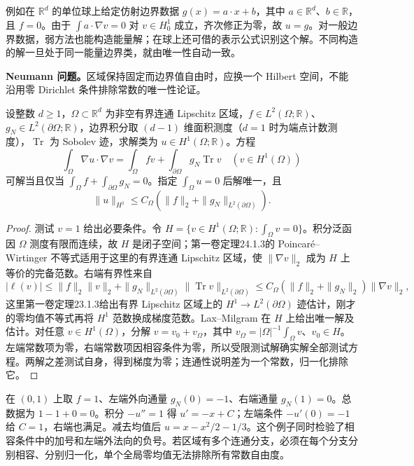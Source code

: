 \ProseParagraphBreak

例如在 \(\mathbb R^d\) 的单位球上给定仿射边界数据 \(g(x)=a\cdot x+b\)，其中 \(a\in\mathbb R^d\)、\(b\in\mathbb R\)，且 \(f=0\)。由于 \(\int a\cdot\nabla v=0\) 对 \(v\in H_0^1\) 成立，齐次修正为零，故 \(u=g\)。对一般边界数据，弱方法也能构造能量解；在球上还可借的表示公式识别这个解。不同构造的解一旦处于同一能量边界类，就由唯一性自动一致。


\ProseParagraphBreak

\noindent\textbf{Neumann 问题。}区域保持固定而边界值自由时，应换一个 Hilbert 空间，不能沿用零 Dirichlet 条件排除常数的唯一性论证。

\begin{proposition}
\label{b2:prop:15-neumann-normalized}
设整数 \(d\geq1\)，\(\Omega\subset\mathbb R^d\) 为非空有界连通 Lipschitz 区域，\(f\in L^2(\Omega;\mathbb R)\)、\(g_N\in L^2(\partial\Omega;\mathbb R)\)，边界积分取 \((d-1)\) 维面积测度（\(d=1\) 时为端点计数测度），\(\operatorname{Tr}\) 为 Sobolev 迹，求解类为 \(u\in H^1(\Omega;\mathbb R)\)。方程
\[\int_\Omega\nabla u\cdot\nabla v
 =\int_\Omega fv+\int_{\partial\Omega}g_N\operatorname{Tr}v
 \quad(v\in H^1(\Omega))\]
可解当且仅当 \(\int_\Omega f+\int_{\partial\Omega}g_N=0\)。指定 \(\int_\Omega u=0\) 后解唯一，且
\[\|u\|_{H^1}\le C_\Omega(\|f\|_2+\|g_N\|_{L^2(\partial\Omega)}).\]
\end{proposition}
\begin{proof}
测试 \(v=1\) 给出必要条件。令 \(H=\{v\in H^1(\Omega;\mathbb R):\int_\Omega v=0\}\)。积分泛函因 \(\Omega\) 测度有限而连续，故 \(H\) 是闭子空间；第一卷定理24.1.3的 Poincaré--Wirtinger 不等式适用于这里的有界连通 Lipschitz 区域，使 \(\|\nabla v\|_2\) 成为 \(H\) 上等价的完备范数。右端有界性来自
\[
 |\ell(v)|\le\|f\|_2\|v\|_2+
 \|g_N\|_{L^2(\partial\Omega)}\|\operatorname{Tr}v\|_{L^2(\partial\Omega)}
 \le C_\Omega(\|f\|_2+\|g_N\|_2)\|\nabla v\|_2,
\]
这里第一卷定理23.1.3给出有界 Lipschitz 区域上的 \(H^1\to L^2(\partial\Omega)\) 迹估计，刚才的零均值不等式再将 \(H^1\) 范数换成梯度范数。Lax--Milgram 在 \(H\) 上给出唯一解及估计。对任意 \(v\in H^1(\Omega)\)，分解 \(v=v_0+v_\Omega\)，其中 \(v_\Omega=|\Omega|^{-1}\int_\Omega v\)、\(v_0\in H\)。左端常数项为零，右端常数项因相容条件为零，所以受限测试解确实解全部测试方程。两解之差测试自身，得到梯度为零；连通性说明差为一个常数，归一化排除它。
\end{proof}

在 \((0,1)\) 上取 \(f=1\)、左端外向通量 \(g_N(0)=-1\)、右端通量 \(g_N(1)=0\)。总数据为 \(1-1+0=0\)。积分 \(-u''=1\) 得 \(u'=-x+C\)；左端条件 \(-u'(0)=-1\) 给 \(C=1\)，右端也满足。减去均值后 \(u=x-x^2/2-1/3\)。这个例子同时检验了相容条件中的加号和左端外法向的负号。若区域有多个连通分支，必须在每个分支分别相容、分别归一化，单个全局零均值无法排除所有常数自由度。
